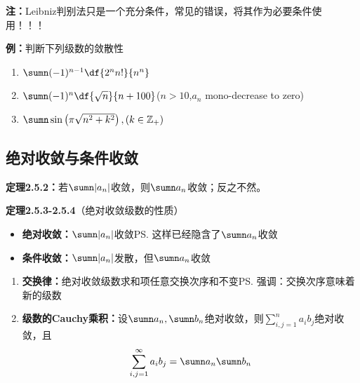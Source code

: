 {\bf 注：}Leibniz判别法只是一个充分条件，常见的错误，将其作为必要条件使用！！！

{\bf 例：}判断下列级数的敛散性
\begin{enumerate} [(1)]
  \setlength{\itemindent}{1cm}
  \item $\sumn(-1)^{n-1}\df{2^nn!}{n^n}$ 
  \item $\sumn(-1)^n\df{\sqrt{n}}{n+100}$\hfill{($n>10$,$a_n$ mono-decrease to
  zero)}
  \item $\sumn\sin\left(\pi\sqrt{n^2+k^2}\right),(k\in\mathbb{Z}_+)$
\end{enumerate}

\subsection{绝对收敛与条件收敛}

{\bf 定理2.5.2：}若$\sumn |a_n|$收敛，则$\sumn a_n$收敛；反之不然。

{\bf 定理2.5.3-2.5.4}（绝对收敛级数的性质）

\begin{itemize}
  \setlength{\itemindent}{1cm}
  \item {\bf 绝对收敛：}$\sumn |a_n|$收敛\ps{这样已经隐含了$\sumn a_n$收敛}
  \item {\bf 条件收敛：}$\sumn |a_n|$发散，但$\sumn a_n$收敛
\end{itemize}

\begin{enumerate}[(1)]
  \setlength{\itemindent}{1cm}
  \item {\bf 交换律：}绝对收敛级数求和项任意交换次序和不变\ps{强调：交换次序意味着新的级数}
  \item {\bf 级数的Cauchy乘积：}设$\sumn a_n,\sumn
	  b_n$绝对收敛，则$\sum\limits_{i,j=1}^na_ib_j$绝对收敛，且
	  $$\sum\limits_{i,j=1}^{\infty}a_ib_j=\sumn a_n\sumn b_n$$
\end{enumerate}

